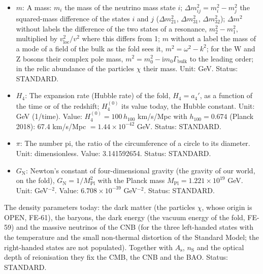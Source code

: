 \documentclass[
  10pt,
]{article}
\begin{document}
\begin{itemize}
  \(i\): A generation index (\(i = 1, 2, 3\)), which also labels the
  three neutrino mass states; in a frame component such as
  \(\mathcal{S}^{(i)}{}_{(i)}\) one of the three directions of ordinary
  space (the three components are equal), and in a tensor of ordinary
  space such as \(\mathsf{h}_{ij}\) one of the directions
  \(x_1, x_2, x_3\); a repeated index is not summed unless a sum sign is
  written. Status: STANDARD.
\item
  \(m\): A mass: \(m_i\) the mass of the neutrino mass state \(i\);
  \(\Delta m_{ij}^2 = m_i^2 - m_j^2\) the squared-mass difference of the
  states \(i\) and \(j\) (\(\Delta m_{21}^2\), \(\Delta m_{31}^2\),
  \(\Delta m_{32}^2\)); \(\Delta m^2\) without labels the difference of
  the two states of a resonance, \(m_2^2 - m_1^2\), multiplied by
  \(v_{\mathrm{loc}}^2/v^2\) where this differs from 1; \(m\) without a
  label the mass of a mode of a field of the bulk as the fold sees it,
  \(m^2 = \omega^2 - k^2\); for the W and Z bosons their complex pole
  mass, \(m^2 = m_0^2 - \mathrm{i}m_0\Gamma_{\mathrm{bulk}}\) to the
  leading order; in the relic abundance of the particles \(\chi\) their
  mass. Unit: GeV. Status: STANDARD.
\item
  \(H_4\): The expansion rate (Hubble rate) of the fold, \(H_4 = a_4'\),
  as a function of the time or of the redshift; \(H_4^{(0)}\) its value
  today, the Hubble constant. Unit: GeV (1/time). Value:
  \(H_4^{(0)} = 100\,h_{100}\) km/s/Mpc with \(h_{100} = 0.674\) (Planck
  2018): 67.4 km/s/Mpc \(= 1.44\times10^{-42}\) GeV. Status: STANDARD.
\item
  \(\pi\): The number pi, the ratio of the circumference of a circle to
  its diameter. Unit: dimensionless. Value: 3.141592654. Status:
  STANDARD.
\item
  \(G_{\mathrm{N}}\): Newton's constant of four-dimensional gravity (the
  gravity of our world, on the fold),
  \(G_{\mathrm{N}} = 1/M_{\mathrm{Pl}}^2\) with the Planck mass
  \(M_{\mathrm{Pl}} = 1.221\times10^{19}\) GeV. Unit: GeV\(^{-2}\).
  Value: \(6.708\times10^{-39}\) GeV\(^{-2}\). Status: STANDARD.
\end{itemize}

The density parameters today: the dark matter (the particles \(\chi\),
whose origin is OPEN, FE-61), the baryons, the dark energy (the vacuum
energy of the fold, FE-59) and the massive neutrinos of the CNB (for the
three left-handed states with the temperature and the small non-thermal
distortion of the Standard Model; the right-handed states are not
populated). Together with \(A_{\mathrm{s}}\), \(n_{\mathrm{S}}\) and the
optical depth of reionisation they fix the CMB, the CNB and the BAO.
Status: STANDARD.
\end{document}
